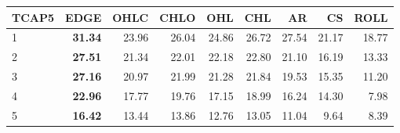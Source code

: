 \begin{table}[ht]
\centering
\begin{tabular}{lrrrrrrrr}
  \hline
TCAP5 & EDGE & OHLC & CHLO & OHL & CHL & AR & CS & ROLL \\ 
  \hline
1 & \textbf{31.34} & 23.96 & 26.04 & 24.86 & 26.72 & 27.54 & 21.17 & 18.77 \\ 
  2 & \textbf{27.51} & 21.34 & 22.01 & 22.18 & 22.80 & 21.10 & 16.19 & 13.33 \\ 
  3 & \textbf{27.16} & 20.97 & 21.99 & 21.28 & 21.84 & 19.53 & 15.35 & 11.20 \\ 
  4 & \textbf{22.96} & 17.77 & 19.76 & 17.15 & 18.99 & 16.24 & 14.30 & 7.98 \\ 
  5 & \textbf{16.42} & 13.44 & 13.86 & 12.76 & 13.05 & 11.04 & 9.64 & 8.39 \\ 
   \hline
\end{tabular}
\end{table}
